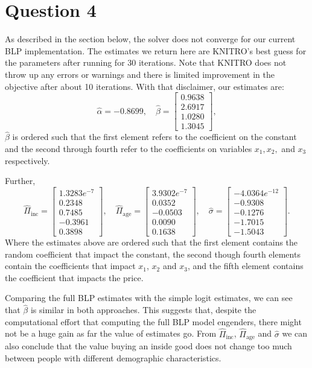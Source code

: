 \documentclass[a4paper,11pt]{article}
\begin{document}
\section*{Question 4}
As described in the section below, the solver does not converge for our current BLP implementation. The estimates we return here are KNITRO's best guess for the parameters after running for 30 iterations. Note that KNITRO does not throw up any errors or warnings and there is limited improvement in the objective after about 10 iterations. With that disclaimer, our estimates are:
\[
\hat\alpha = -0.8699, \quad
\hat\beta = \left[ \begin{array}{r} 
0.9638 \\ 2.6917 \\ 1.0280 \\ 1.3045
\end{array}\right],
\]
$\hat\beta$ is ordered such that the first element refers to the coefficient on the constant and the second through fourth refer to the coefficients on variables $x_1, x_2,$ and $x_3$ respectively.

\noindent Further,
\[
\hat\Pi_{\mathrm{inc}} = \left[ \begin{array}{r}
1.3283e^{-7} \\ 0.2348 \\ 0.7485 \\ -0.3961 \\ 0.3898
\end{array}\right],
\quad
\hat\Pi_{\mathrm{age}} = \left[ \begin{array}{r}
3.9302e^{-7} \\ 0.0352 \\ -0.0503 \\ 0.0090 \\ 0.1638
\end{array}\right],
\quad
\hat\sigma = \left[ \begin{array}{r}
-4.0364e^{-12} \\ -0.9308 \\ -0.1276 \\ -1.7015 \\ -1.5043
\end{array}\right].
\]
Where the estimates above are ordered such that the first element contains the random coefficient that impact the constant, the second though fourth elements contain the coefficients that impact $x_1$, $x_2$ and $x_3$, and the fifth element contains the coefficient that impacts the price.

Comparing the full BLP estimates with the simple logit estimates, we can see that $\hat\beta$ is similar in both approaches. This suggests that, despite the computational effort that computing the full BLP model engenders, there might not be a huge gain as far the value of estimates go. From $\hat\Pi_{\mathrm{inc}}$, $\hat\Pi_{\mathrm{age}}$ and $\hat\sigma$ we can also conclude that the value buying an inside good does not change too much between people with different demographic characteristics. 
\end{document}
